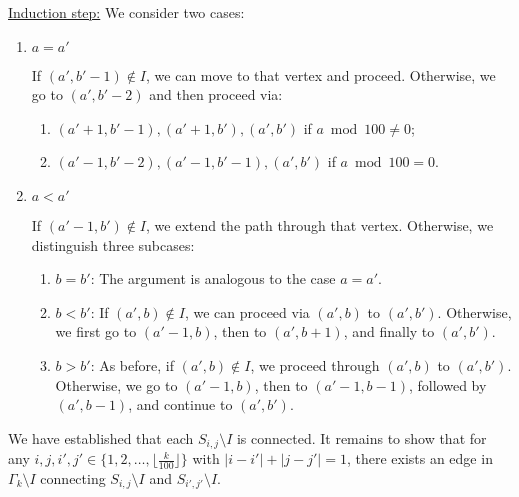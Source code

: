 \documentclass[12pt]{article}
\begin{document}
	\underline{Induction step:} We consider two cases:
	\begin{enumerate}
		\item \(a = a'\)
		      
		      If \((a', b' - 1) \notin I\), we can move to that vertex and
		      proceed. Otherwise, we go to \((a', b' - 2)\) and then proceed
		      via:
		      \begin{enumerate}[label=\theenumi.\arabic*]
		          \item \((a' + 1, b' - 1), (a' + 1, b'), (a', b')\) if \(a
		                \bmod 100 \neq 0\);
		          \item \((a' - 1, b' - 2), (a' - 1, b' - 1), (a', b')\) if \(a
		                \bmod 100 = 0\).
		      \end{enumerate}
		
		\item \(a < a'\)
		      
		      If \((a' - 1, b') \notin I\), we extend the path through that
		      vertex. Otherwise, we distinguish three subcases:
		      \begin{enumerate}[label=\theenumi.\arabic*]
		          \item \(b = b'\): The argument is analogous to the case \(a =
		                a'\).
		          \item \(b < b'\): If \((a', b) \notin I\), we can proceed via
		                \((a', b)\) to \((a', b')\). Otherwise, we first go to
		                \((a' - 1, b)\), then to \((a', b + 1)\), and finally to
		                \((a', b')\).
		          \item \(b > b'\): As before, if \((a', b) \notin I\), we
		                proceed through \((a', b)\) to \((a', b')\). Otherwise,
		                we go to \((a' - 1, b)\), then to \((a' - 1, b - 1)\),
		                followed by \((a', b - 1)\), and continue to \((a',
		                b')\).
		      \end{enumerate}
	\end{enumerate}
	
	\medskip
	
	We have established that each \(S_{i, j} \setminus I\) is connected. It
	remains to show that for any \(i, j, i', j' \in \big\{ 1, 2, \ldots,
	\big\lfloor \frac{k}{100} \big\rfloor \big\}\) with \(|i - i'| + |j - j'| =
	1\), there exists an edge in \(\Gamma_{k} \setminus I\) connecting
	\(S_{i, j} \setminus I\) and \(S_{i', j'} \setminus I\).
	
	\medskip
	
\end{document}
